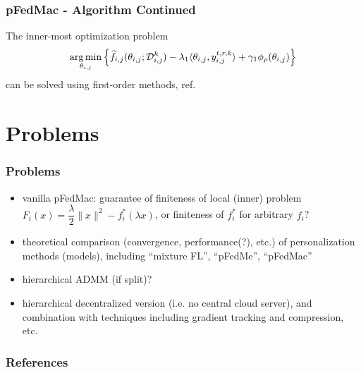 
\begin{frame}
\frametitle{pFedMac - Algorithm Continued}

The inner-most optimization problem
$$\operatorname*{arg\,min}\limits_{\theta_{i,j}} \left\{ \widetilde{f}_{i,j}(\theta_{i,j}; \mathcal{D}_{i,j}^k) - \lambda_1 \langle \theta_{i,j}, y_{i,j}^{t,r,k} \rangle + \gamma_1 \phi_{\rho}(\theta_{i,j}) \right\}$$
can be solved using first-order methods, ref. \cite{lin2020accelerated}


\end{frame}


\section{Problems}


\begin{frame}
\frametitle{Problems}

\begin{itemize}
    \item vanilla pFedMac: guarantee of finiteness of local (inner) problem $F_i(x) = \dfrac{\lambda}{2} \lVert x \rVert^2 - f_i^*(\lambda x)$, or finiteness of $f_i^*$ for arbitrary $f_i$?
    \vspace{0.3em}
    \item theoretical comparison (convergence, performance(?), etc.) of personalization methods (models), including ``mixture FL'', ``pFedMe'', ``pFedMac''
    \vspace{0.3em}
    \item hierarchical ADMM (if split)?
    \vspace{0.3em}
    \item hierarchical decentralized version (i.e. no central cloud server), and combination with techniques including gradient tracking and compression, etc.
\end{itemize}

\end{frame}


\begin{frame}[allowframebreaks]
\frametitle{References}

{\footnotesize


}

\end{frame}



